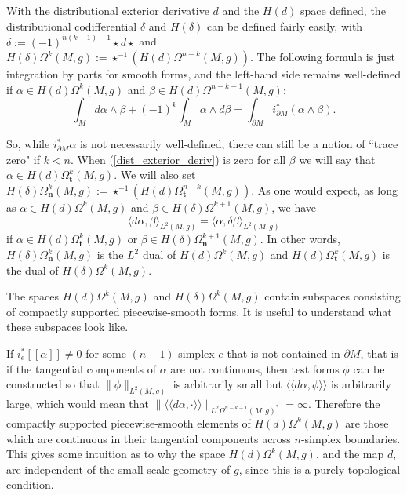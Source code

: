 \documentclass[11pt]{article}
\newcommand{\iprod}[1]{\langle #1 \rangle}
\begin{document}
With the distributional exterior derivative $d$ and the $H(d)$ space defined, the distributional codifferential $\delta$ and $H(\delta)$ can be defined fairly easily, with $\delta := (-1)^{n(k-1) - 1} \star d \star$ and $H(\delta)\Omega^k(M,g) := \star^{-1}(H(d)\Omega^{n-k}(M,g))$. The following formula is just integration by parts for smooth forms, and the left-hand side remains well-defined if $\alpha \in  H(d)\Omega^k(M,g)$ and $\beta \in H(d)\Omega^{n-k-1}(M,g)$:
\begin{equation}\label{dist_exterior_deriv}
\int_M d\alpha \wedge \beta + (-1)^k \int_M \alpha \wedge d\beta = \int_{\partial M} i_{\partial M}^*(\alpha \wedge \beta).
\end{equation}

So, while $i_{\partial M}^* \alpha$ is not necessarily well-defined, there can still be a notion of ``trace zero" if $k < n$. When (\ref{dist_exterior_deriv}) is zero for all $\beta$ we will say that $\alpha \in H(d)\Omega_\mathbf{t}^k(M,g)$. We will also set $H(\delta)\Omega^k_\mathbf{n}(M,g) := \star^{-1}(H(d)\Omega_\mathbf{t}^{n-k}(M,g))$. As one would expect, as long as $\alpha \in H(d)\Omega^k(M,g)$ and $\beta \in H(\delta)\Omega^{k+1}(M,g)$, we have
\[
\iprod{d\alpha,\beta}_{L^2(M,g)} = \iprod{\alpha,\delta\beta}_{L^2(M,g)}
\]
if $\alpha \in H(d)\Omega^k_\mathbf{t}(M,g)$ or $\beta \in H(\delta)\Omega^{k+1}_\mathbf{n}(M,g)$. In other words, $H(\delta)\Omega^k_{\mathbf{n}}(M,g)$ is the $L^2$ dual of $H(d)\Omega^k(M,g)$ and $H(d)\Omega^k_{\mathbf{t}}(M,g)$ is the dual of $H(\delta)\Omega^k(M,g)$.

The spaces $H(d)\Omega^k(M,g)$ and $H(\delta)\Omega^k(M,g)$ contain subspaces consisting of compactly supported piecewise-smooth forms. It is useful to understand what these subspaces look like.

If $i_e^*[\![\alpha]\!] \ne 0$ for some $(n-1)$-simplex $e$ that is not contained in $\partial M$, that is if the tangential components of $\alpha$ are not continuous, then test forms $\phi$ can be constructed so that $\|\phi\|_{L^2(M,g)}$ is arbitrarily small but $\iprod{\iprod{d\alpha,\phi}}$ is arbitrarily large, which would mean that $\|\iprod{\iprod{d\alpha,\cdot}}\|_{L^2\Omega^{n-k-1}(M,g)^*} = \infty$. Therefore the compactly supported piecewise-smooth elements of $H(d)\Omega^k(M,g)$ are those which are continuous in their tangential components across $n$-simplex boundaries. This gives some intuition as to why the space $H(d)\Omega^k(M,g)$, and the map $d$, are independent of the small-scale geometry of $g$, since this is a purely topological condition.
\end{document}

